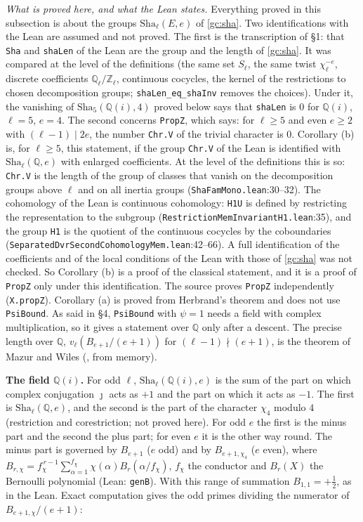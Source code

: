\documentclass[11pt,letterpaper]{article}
\newcommand{\Z}{\mathbb Z}\newcommand{\Q}{\mathbb Q}\newcommand{\C}{\mathbb C}
\begin{document}
\emph{What is proved here, and what the Lean states.} Everything proved in this subsection is about the
groups $\mathrm{Sha}_\ell(E,e)$ of \eqref{gc:sha}. Two identifications with the Lean are assumed and not
proved. The first is the transcription of \S1: that \texttt{Sha} and \texttt{shaLen} of the Lean are the
group and the length of \eqref{gc:sha}. It was compared at the level of the definitions (the same set
$S_\ell$, the same twist $\chi_\ell^{-e}$, discrete coefficients $\Q_\ell/\Z_\ell$, continuous cocycles, the
kernel of the restrictions to chosen decomposition groups; \texttt{shaLen\_eq\_}\allowbreak\texttt{shaInv}
removes the choices). Under it, the vanishing of $\mathrm{Sha}_5(\Q(i),4)$ proved below says that
\texttt{shaLen} is $0$ for $\Q(i)$, $\ell=5$, $e=4$. The second concerns \texttt{PropZ}, which says: for
$\ell\ge5$ and even $e\ge2$ with $(\ell-1)\mid2e$, the number \texttt{Chr.V} of the trivial character is $0$.
Corollary (b) is, for $\ell\ge5$, this statement, if the group \texttt{Chr.V}
of the Lean is identified with $\mathrm{Sha}_\ell(\Q,e)$ with enlarged coefficients. At the level of the
definitions this is so: \texttt{Chr.V} is the length of the group of classes that vanish on the
decomposition groups above $\ell$ and on all inertia groups (\texttt{ShaFamMono.lean}:30--32). The cohomology of the Lean
is continuous cohomology: \texttt{H1U} is defined by restricting the representation to the subgroup
(\texttt{RestrictionMemInvariantH1.lean}:35), and the group \texttt{H1} is the quotient of the continuous
cocycles by the coboundaries (\texttt{SeparatedDvrSecondCohomologyMem.lean}:42--66). A full identification of
the coefficients and of the local conditions of the Lean with those of \eqref{gc:sha} was not checked. So
Corollary (b) is a proof of the classical statement, and it is a proof of \texttt{PropZ} only under this
identification. The source proves \texttt{PropZ} independently (\texttt{X.propZ}). Corollary (a) is proved from Herbrand's
theorem and does not use \texttt{PsiBound}. As said in \S4, \texttt{PsiBound} with $\psi=1$ needs a field
with complex multiplication, so it gives a statement over $\Q$ only after a descent. The precise length over
$\Q$, $v_\ell(B_{e+1}/(e+1))$ for $(\ell-1)\nmid(e+1)$, is the theorem of Mazur and
Wiles (\cite{MW84}, from memory).

\textbf{The field $\Q(i)$.} For odd $\ell$, $\mathrm{Sha}_\ell(\Q(i),e)$ is the sum of the part on which
complex conjugation $\jmath$ acts as $+1$ and the part on which it acts as $-1$. The first is
$\mathrm{Sha}_\ell(\Q,e)$, and the second is the part of the character $\chi_4$ modulo $4$
(restriction and corestriction; not proved here). For odd $e$ the first is the minus part and the second
the plus part; for even $e$ it is the other way round. The minus part is governed by $B_{e+1}$ ($e$ odd)
and by $B_{e+1,\chi_4}$ ($e$ even), where
$B_{r,\chi}=f_\chi^{\,r-1}\sum_{\alpha=1}^{f_\chi}\chi(\alpha)B_r(\alpha/f_\chi)$, $f_\chi$ the conductor and
$B_r(X)$ the Bernoulli polynomial (Lean: \texttt{genB}). With this range of summation $B_{1,1}=+\frac12$, as
in the Lean. Exact computation gives the odd primes dividing the numerator of $B_{e+1,\chi}/(e+1)$:
\end{document}
